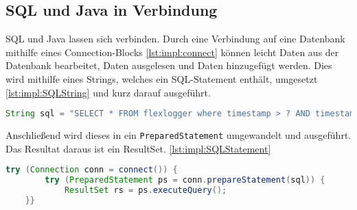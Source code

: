\subsection{SQL und Java in Verbindung}

SQL und Java lassen sich verbinden. Durch eine Verbindung auf eine Datenbank mithilfe eines Connection-Blocks \ref{lst:impl:connect} können leicht Daten aus der Datenbank bearbeitet, Daten ausgelesen und Daten hinzugefügt werden. Dies wird mithilfe eines Strings, welches ein SQL-Statement enthält, umgesetzt  \ref{lst:impl:SQLString} und kurz darauf ausgeführt. 

\begin{lstlisting}[language=java,caption=SQL-String,label=lst:impl:SQLString]
    String sql = "SELECT * FROM flexlogger where timestamp > ? AND timestamp < ? order by timestamp";
\end{lstlisting}

Anschließend wird dieses in ein \texttt{PreparedStatement} umgewandelt und ausgeführt. Das Resultat daraus ist ein ResultSet. \ref{lst:impl:SQLStatement}

\begin{lstlisting}[language=java,caption=SQL-Statement ausführen,label=lst:impl:SQLStatement]
    try (Connection conn = connect()) {
        try (PreparedStatement ps = conn.prepareStatement(sql)) {
            ResultSet rs = ps.executeQuery();
    }}
\end{lstlisting}
